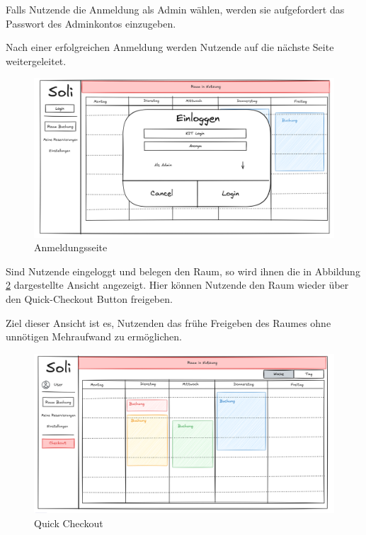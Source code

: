 Falls Nutzende die Anmeldung als Admin wählen, werden sie aufgefordert das Passwort des Adminkontos einzugeben.

Nach einer erfolgreichen Anmeldung werden Nutzende auf die nächste Seite weitergeleitet.
\begin{figure}[ht]
    \centering
    \includegraphics[scale=0.15]{figures/ui/anmeldungsseite}
    \caption{Anmeldungsseite}
    \label{fig:login}
\end{figure}
\clearpage

Sind Nutzende eingeloggt und belegen den Raum,
so wird ihnen die in Abbildung \ref{fig:checkout} dargestellte Ansicht angezeigt.
Hier können Nutzende den Raum wieder über den Quick-Checkout Button freigeben.


Ziel dieser Ansicht ist es, Nutzenden das frühe Freigeben des Raumes ohne unnötigen Mehraufwand zu ermöglichen.
\begin{figure}[ht]
    \centering
    \includegraphics[scale=0.15]{figures/ui/checkout}
    \caption{Quick Checkout}
    \label{fig:checkout}
\end{figure}
\clearpage

